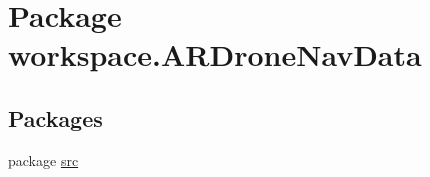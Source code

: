 \hypertarget{namespaceworkspace_1_1_a_r_drone_nav_data}{}\section{Package workspace.\+A\+R\+Drone\+Nav\+Data}
\label{namespaceworkspace_1_1_a_r_drone_nav_data}
\subsection*{Packages}
\begin{DoxyCompactItemize}
\item 
package \hyperlink{namespaceworkspace_1_1_a_r_drone_nav_data_1_1src}{src}
\end{DoxyCompactItemize}
